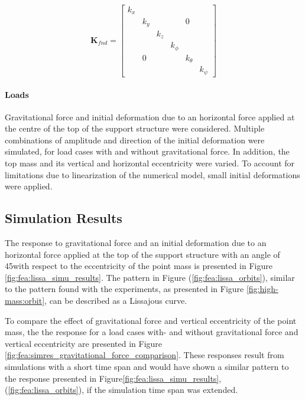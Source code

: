 \documentclass{article}
\begin{document}
\begin{small}
    \begin{equation}
        \mathbf{K}_{fnd} =
        \begin{bmatrix}
        k_{x} &  &  &   &   &   \\ &  k_{y} &  &   & 0  &   \\ &   &  k_{z} &  &   &   \\ & &   &  k_{\phi } &  &   \\ &   0  &   &   &  k_{\theta } &  \\ &   &   &   &   &  k_{\psi } 
        \end{bmatrix}
        \label{eq:fea:K_fnd}
    \end{equation}
\end{small}

\paragraph{Loads }
Gravitational force and initial deformation due to an horizontal force applied at the centre of the top of the support structure were considered. Multiple combinations of amplitude and direction of the initial deformation were simulated, for load cases with and without gravitational force. In addition, the top mass and its vertical and horizontal eccentricity were varied.  To account for limitations due to linearization of the numerical model, small initial deformations were applied.

\subsection{Simulation Results}
The response to gravitational force and an initial deformation due to an horizontal force applied at the top of the  support structure with an angle of 45\textdegree with respect to the eccentricity of the point mass is presented in Figure \ref{fig:fea:lissa_simu_results}. The pattern in Figure  (\ref{fig:fea:lissa_orbits}),  similar to the pattern found with the experiments, as presented in Figure \ref{fig:high-mass:orbit}, can be described as a Lissajous curve. 

To compare the effect of gravitational force and vertical eccentricity of the point mass, the the response  for a load cases with- and without gravitational force and vertical eccentricity are presented in Figure \ref{fig:fea:simres_gravitational_force_comparison}. These responses result from simulations with a short time span and would have shown a similar pattern to the response presented in Figure\ref{fig:fea:lissa_simu_results}, (\ref{fig:fea:lissa_orbits}), if the simulation time span was extended. 
\end{document}
